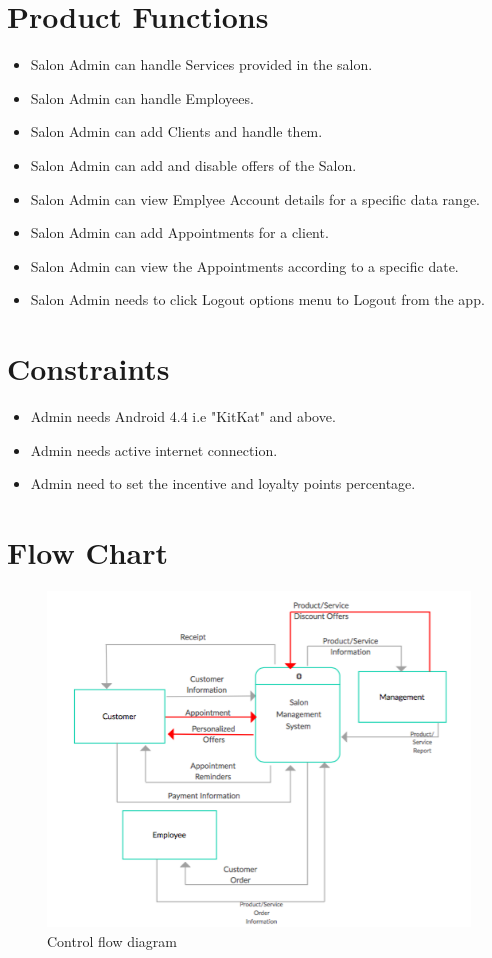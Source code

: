 \section{Product Functions}
\begin{itemize}
	\item Salon Admin can handle Services provided in the salon.
	\item Salon Admin can handle Employees.
	\item Salon Admin can add Clients and handle them.
	\item Salon Admin can add and disable offers of the Salon.
	\item Salon Admin can view Emplyee Account details for a specific data range.
	\item Salon Admin can add Appointments for a client.
	\item Salon Admin can view the Appointments according to a specific date.
	\item Salon Admin needs to click Logout options menu to Logout from the app.
\end{itemize}

\section{Constraints} 
\begin{itemize}
	\item Admin needs Android 4.4 i.e "KitKat" and above.
	\item Admin needs active internet connection.
	\item Admin need to set the incentive and loyalty points percentage.
\end{itemize}

\section{Flow Chart}

\begin{figure}[h]
	\centering
	\includegraphics[width=1.0\linewidth]{flowchart}
	\caption{Control flow diagram}
	\label{fig:flowchart}
\end{figure}
